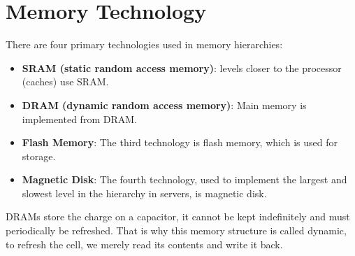 \documentclass[letterpaper,c12pt]{article}
\begin{document}
\section{Memory Technology}
There are four primary technologies used in memory hierarchies: 
\begin{itemize}
	\item \textbf{SRAM (static random access memory)}: levels closer to the processor (caches) use SRAM.
	\item \textbf{DRAM (dynamic random access memory)}: Main memory is implemented from DRAM.
	\item \textbf{Flash Memory}: The third technology is flash memory, which is used for storage.
	\item \textbf{Magnetic Disk}: The fourth technology, used to implement the largest and slowest level in the hierarchy in servers, is magnetic disk.
\end{itemize}
DRAMs store the charge on a capacitor, it cannot be kept indefinitely and must periodically be refreshed. That is why this memory structure is called dynamic, to refresh the cell, we merely read its contents and write it back.
\end{document}
